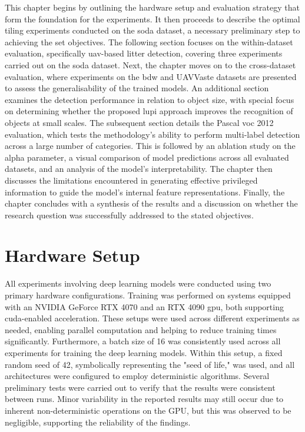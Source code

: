 This chapter begins by outlining the hardware setup and evaluation strategy that form the foundation for the experiments. It then proceeds to describe the optimal tiling experiments conducted on the \gls{soda} dataset, a necessary preliminary step to achieving the set objectives. The following section focuses on the within-dataset evaluation, specifically \gls{uav}-based litter detection, covering three experiments carried out on the \gls{soda} dataset. Next, the chapter moves on to the cross-dataset evaluation, where experiments on the \gls{bdw} and UAVVaste datasets are presented to assess the generalisability of the trained models. An additional section examines the detection performance in relation to object size, with special focus on determining whether the proposed \gls{lupi} approach improves the recognition of objects at small scales. The subsequent section details the Pascal \gls{voc} 2012 evaluation, which tests the methodology's ability to perform multi-label detection across a large number of categories. This is followed by an ablation study on the alpha parameter, a visual comparison of model predictions across all evaluated datasets, and an analysis of the model's interpretability. The chapter then discusses the limitations encountered in generating effective privileged information to guide the model’s internal feature representations. Finally, the chapter concludes with a synthesis of the results and a discussion on whether the research question was successfully addressed to the stated objectives.

\section{Hardware Setup}
\label{sec:5_hardware_setup}

All experiments involving deep learning models were conducted using two primary hardware configurations. Training was performed on systems equipped with an NVIDIA GeForce RTX 4070 and an RTX 4090 \gls{gpu}, both supporting \gls{cuda}-enabled acceleration. These setups were used across different experiments as needed, enabling parallel computation and helping to reduce training times significantly. Furthermore, a batch size of 16 was consistently used across all experiments for training the deep learning models.
Within this setup, a fixed random seed of 42, symbolically representing the "seed of life," was used, and all architectures were configured to employ deterministic algorithms. Several preliminary tests were carried out to verify that the results were consistent between runs. Minor variability in the reported results may still occur due to inherent non-deterministic operations on the GPU, but this was observed to be negligible, supporting the reliability of the findings.


